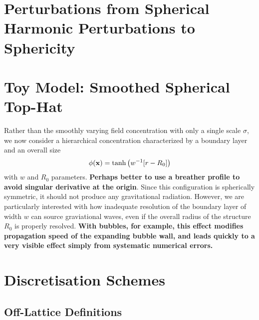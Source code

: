 \documentclass{revtex4}
\begin{document}
\section{Perturbations from Spherical Harmonic Perturbations to Sphericity}

\section{Toy Model: Smoothed Spherical Top-Hat}
Rather than the smoothly varying field concentration with only a single scale $\sigma$, we now consider a hierarchical concentration characterized by a boundary layer and an overall size
\begin{equation}
  \phi({\bf x}) = \tanh\left(w^{-1}[r-R_0]\right)
\end{equation}
with $w$ and $R_0$ parameters.
{\bf Perhaps better to use a breather profile to avoid singular derivative at the origin}.
Since this configuration is spherically symmetric, it should not produce any gravitational radiation.
However, we are particularly interested with how inadequate resolution of the boundary layer of width $w$ can source graviational waves, even if the overall radius of the structure $R_0$ is properly resolved.
{\bf With bubbles, for example, this effect modifies propagation speed of the expanding bubble wall, and leads quickly to a very visible effect simply from systematic numerical errors.}



\section{Discretisation Schemes}
\subsection{Off-Lattice Definitions}
\end{document}
